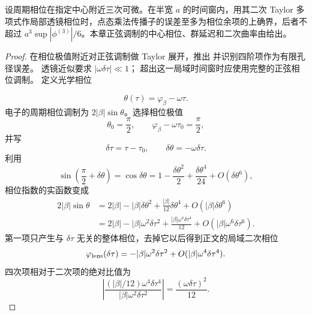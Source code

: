 \begin{proposition}[周期相位的局部二次展开]
设周期相位在指定中心附近三次可微。在半宽 $a$ 的时间窗内，用其二次 Taylor 多项式作局部透镜相位时，点态乘法传播子的误差至多为相位余项的上确界，后者不超过 $a^3\sup|\phi^{(3)}|/6$。本章正弦调制的中心相位、群延迟和二次曲率由给出。
\end{proposition}
\begin{proof}
在相位极值附近对正弦调制做 Taylor 展开，推出 并识别四阶项作为有限孔径误差。 透镜近似要求 $|\omega\delta\tau|\ll1$； 超出这一局域时间窗时应使用完整的正弦相位调制。 定义光学相位

\begin{equation*}
\theta(\tau)=\varphi_\beta-\omega\tau .
\end{equation*}
电子的周期相位调制为 $2|\beta|\sin\theta$。选择相位极值
\begin{equation*}
\theta_0=\frac{\pi}{2},
\qquad
\varphi_\beta-\omega\tau_0=\frac{\pi}{2},
\end{equation*}
并写
\begin{equation*}
\delta\tau=\tau-\tau_0,
\qquad
\delta\theta=-\omega\delta\tau.
\end{equation*}
利用
\begin{equation*}
\sin\!\left(\frac\pi2+\delta\theta\right)
=\cos\delta\theta
=1-\frac{\delta\theta^2}{2}
+\frac{\delta\theta^4}{24}
+O(\delta\theta^6),
\end{equation*}
相位指数的实函数变成
\begin{align*}
2|\beta|\sin\theta
&=2|\beta|
-|\beta|\delta\theta^2
+\frac{|\beta|}{12}\delta\theta^4
+O(|\beta|\delta\theta^6)\\
&=2|\beta|
-|\beta|\omega^2\delta\tau^2
+\frac{|\beta|\omega^4\delta\tau^4}{12}
+O(|\beta|\omega^6\delta\tau^6).
\end{align*}
第一项只产生与 $\delta\tau$ 无关的整体相位，去掉它以后得到正文的局域二次相位
\begin{equation*}
\varphi_{\rm lens}(\delta\tau)
=-|\beta|\omega^2\delta\tau^2
+O(|\beta|\omega^4\delta\tau^4).
\end{equation*}
四次项相对于二次项的绝对比值为
\begin{equation*}
\left|
\frac{(|\beta|/12)\omega^4\delta\tau^4}
{|\beta|\omega^2\delta\tau^2}
\right|
=\frac{(\omega\delta\tau)^2}{12}.
\end{equation*}
\end{proof}


